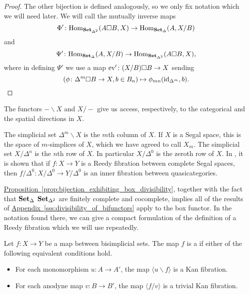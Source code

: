 \documentclass[main.tex]{subfiles}
\begin{document}
\begin{proof}
  The other bijection is defined analogously, so we only fix notation which we will need later. We will call the mutually inverse maps
  \begin{equation*}
    \Phi'\colon \mathrm{Hom}_{\mathbf{Set}_{\Delta^{2}}}(A \square B, X) \to \mathrm{Hom}_{\mathbf{Set}_{\Delta}}(A, X / B)
  \end{equation*}
  and
  \begin{equation*}
    \Psi'\colon \mathrm{Hom}_{\mathbf{Set}_{\Delta}}(A, X / B) \to \mathrm{Hom}_{\mathbf{Set}_{\Delta^{2}}}(A \square B, X),
  \end{equation*}
  where in defining $\Psi'$ we use a map $\mathrm{ev}'\colon (X / B) \square B \to X$ sending
  \begin{equation*}
    (\phi\colon \Delta^{m} \square B \to X, b \in B_{n}) \mapsto \phi_{mn}(\mathrm{id}_{\Delta^{m}}, b).\qedhere
  \end{equation*}
\end{proof}

The functors $-\backslash X$ and $X / -$ give us access, respectively, to the categorical and the spatial directions in $X$.

The simplicial set $\Delta^{m} \backslash X$ is the $m$th column of $X$. If $X$ is a Segal space, this is the space of $m$-simplices of $X$, which we have agreed to call $X_{m}$. The simplicial set $X / \Delta^{n}$ is the $n$th row of $X$. In particular $X / \Delta^{0}$ is the zeroth row of $X$. In \cite{qcats_vs_segal_spaces}, it is shown that if $f\colon X \to Y$ is a Reedy fibration between complete Segal spaces, then $f / \Delta^{0}\colon X / \Delta^{0} \to Y / \Delta^{0}$ is an inner fibration between quasicategories.

\hyperref[prop:bijection_exhibiting_box_divisibility]{Proposition~\ref*{prop:bijection_exhibiting_box_divisibility}}, together with the fact that $\mathbf{Set}_{\Delta}$ $\mathbf{Set}_{\Delta^{2}}$ are finitely complete and cocomplete, implies all of the results of \hyperref[sss:divisibility_of_bifunctors]{Appendix~\ref*{sss:divisibility_of_bifunctors}} apply to the box functor. In the notation found there, we can give a compact formulation of the definition of a Reedy fibration which we will use repeatedly.

\begin{definition}
  \label{def:reedy_fibration}
  Let $f\colon X \to Y$ be a map between bisimplicial sets. The map $f$ is a  if either of the following equivalent conditions hold.
  \begin{itemize}
    \item For each monomorphism $u\colon A \to A'$, the map $\langle u \backslash f \rangle$ is a Kan fibration.

    \item For each anodyne map $v\colon B \to B'$, the map $\langle f / v \rangle$ is a trivial Kan fibration.
  \end{itemize}
\end{definition}
\end{document}
